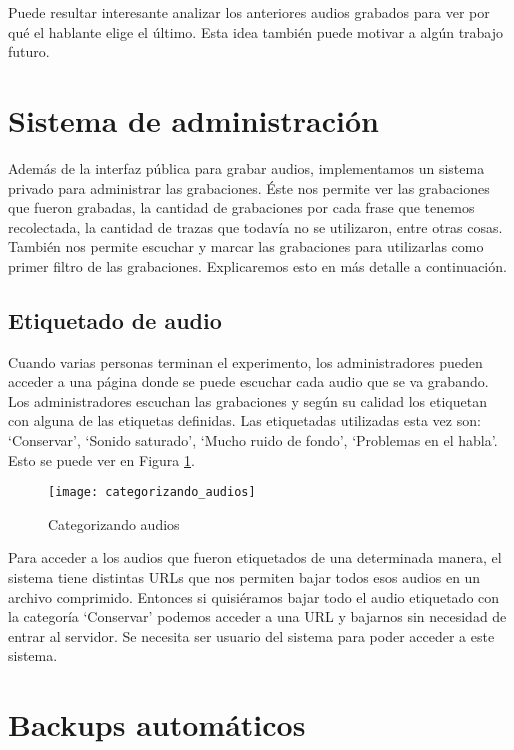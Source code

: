 Puede resultar interesante analizar los anteriores audios grabados para ver por qué el hablante elige el último. Esta idea también puede motivar a algún trabajo futuro.

\section{Sistema de administración}

Además de la interfaz pública para grabar audios, implementamos un sistema privado para administrar las grabaciones. Éste nos permite ver las grabaciones que fueron grabadas, la cantidad de grabaciones por cada frase que tenemos recolectada, la cantidad de trazas que todavía no se utilizaron, entre otras cosas. También nos permite escuchar y marcar las grabaciones para utilizarlas como primer filtro de las grabaciones. Explicaremos esto en más detalle a continuación.

\subsection{Etiquetado de audio}

Cuando varias personas terminan el experimento, los administradores pueden acceder a una página donde se puede escuchar cada audio que se va grabando. Los administradores escuchan las grabaciones y según su calidad los etiquetan con alguna de las etiquetas definidas. Las etiquetadas utilizadas esta vez son: `Conservar’,  `Sonido saturado’, `Mucho ruido de fondo’, `Problemas en el habla’. Esto se puede ver en Figura \ref{cat}.

\begin{figure}[h!]
    \centerline{\texttt{[image: categorizando\_audios]} }
    \caption{Categorizando audios}
    \label{cat}
\end{figure}

Para acceder a los audios que fueron etiquetados de una determinada manera, el sistema tiene distintas URLs que nos permiten bajar todos esos audios en un archivo comprimido. Entonces si quisiéramos bajar todo el audio etiquetado con la categoría `Conservar’ podemos acceder a una URL y bajarnos sin necesidad de entrar al servidor. Se necesita ser usuario del sistema para poder acceder a este sistema.

\section{Backups automáticos}

